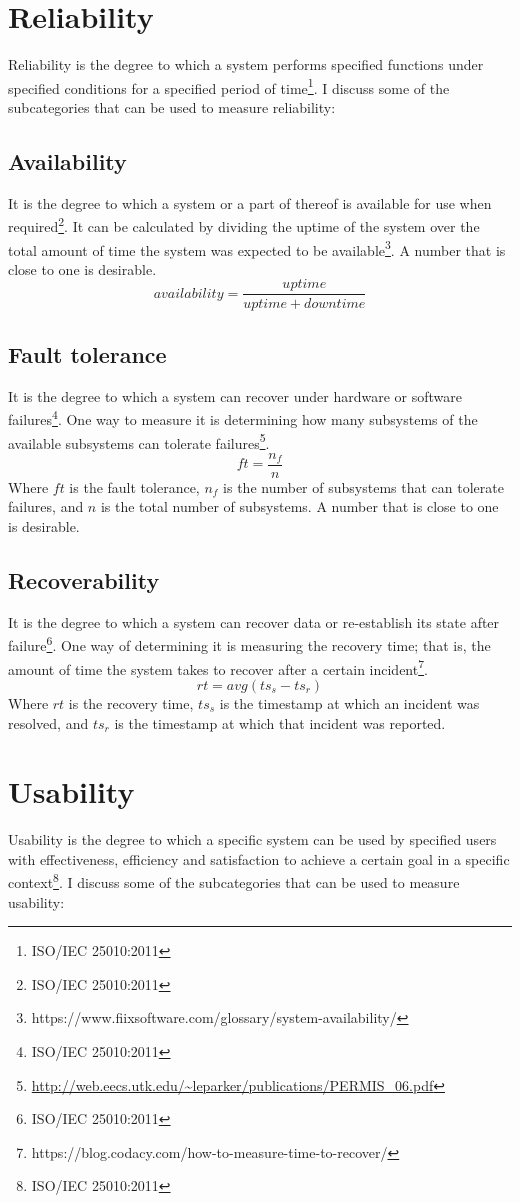 \documentclass[11pt,a4paper]{article}
\def \iso{\footnote{ISO/IEC 25010:2011}}
\begin{document}
\section{Reliability}
Reliability is the degree to which a system performs specified functions under specified conditions for a specified period of
time\iso. I discuss some of the subcategories that can be used to measure reliability:

\subsection{Availability}
It is the degree to which a system or a part of thereof is available for use when required\iso. It can be calculated by
dividing the uptime of the system over the total amount of time the system was expected to be
available\footnote{https://www.fiixsoftware.com/glossary/system-availability/}.
A number that is close to one is desirable.
\[availability = \frac{uptime}{uptime + downtime}\]

\subsection{Fault tolerance}
It is the degree to which a system can recover under hardware or software failures\iso.
One way to measure it is determining how many subsystems of the available subsystems
can tolerate failures\footnote{\url{http://web.eecs.utk.edu/~leparker/publications/PERMIS_06.pdf}}.
\[ft = \frac{n_f}{n}\]
Where $ft$ is the fault tolerance, $n_f$ is the number of subsystems that can tolerate failures,
and $n$ is the total number of subsystems. A number that is close to one is desirable.

\subsection{Recoverability}
It is the degree to which a system can recover data or re-establish its state after failure\iso.
One way of determining it is measuring the recovery time;
that is, the amount of time the system takes to recover after a certain
incident\footnote{https://blog.codacy.com/how-to-measure-time-to-recover/}.
\[rt = avg(ts_s - ts_r)\]
Where $rt$ is the recovery time, $ts_s$ is the timestamp at which an incident was resolved,
and $ts_r$ is the timestamp at which that incident was reported.

\section{Usability}
Usability is the degree to which a specific system can be used by specified users with
effectiveness, efficiency and satisfaction to achieve a certain goal in a specific context\iso.
I discuss some of the subcategories that can be used to measure usability:
\end{document}
